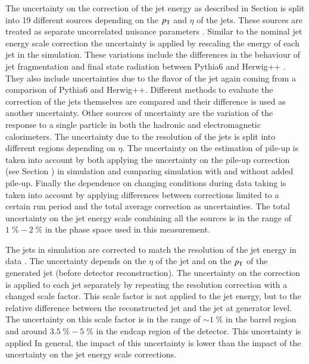 The uncertainty on the correction of the jet energy as described in Section  is split into 19 different sources depending on the $p_{\mathrm{T}}$ and $\eta$ of the jets.
These sources are treated as separate uncorrelated nuisance parameters \cite{CMS-PAS-JME-16-003,Khachatryan:2016kdb}.
Similar to the nominal jet energy scale correction  the uncertainty is applied by rescaling the energy of each jet in the simulation.
These variations include the differences in the behaviour of jet fragmentation and final state radiation between Pythia6 and Herwig++ .
They also include uncertainties due to the flavor of the jet again coming from a comparison of Pythia6 and Herwig++.
Different methods to evaluate the correction of the jets themselves are compared and their difference is used as another uncertainty.
Other sources of uncertainty are the variation of the response to a single particle in both the hadronic and electromagnetic calorimeters.
The uncertainty due to the resolution of the jets is split into different regions depending on $\eta$.
The uncertainty on the estimation of pile-up is taken into account by both applying the uncertainty on the pile-up correction (see Section ) in simulation and comparing simulation with and without added pile-up.
Finally the dependence on changing conditions during data taking is taken into account by applying differences between corrections limited to a certain run period and the total average correction as uncertainties.
The total uncertainty on the jet energy scale combining all the sources is in the range of $1\; \%  - 2\; \%$ in the phase space used in this measurement.

The jets in simulation are corrected to match the resolution of the jet energy in data . The uncertainty depends on the $\eta$ of the jet and on
the $p_{\mathrm{T}}$ of the generated jet (before detector reconstruction). 
The uncertainty on the correction is applied to each jet separately by repeating the resolution correction with a changed scale factor.
This scale factor is not applied to the jet energy, but to the relative difference between the reconstructed jet and the jet at generator level.
The uncertainty on this scale factor is in the range of $\sim 1 \; \%$ in the barrel region and around $3.5 \; \% - 5 \; \%$ in the endcap region of the detector.
This uncertainty is applied 
In general, the impact of this uncertainty is lower than the impact 
of the uncertainty on the jet energy scale corrections.

